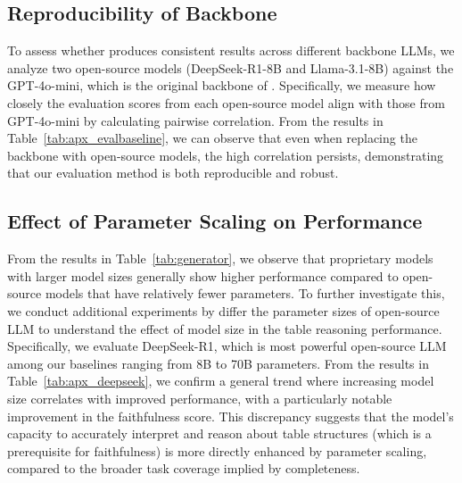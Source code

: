 \subsection{Reproducibility of \eval Backbone}
To assess whether \eval produces consistent results across different backbone LLMs, we analyze two open-source models (DeepSeek-R1-8B and Llama-3.1-8B) against the GPT-4o-mini, which is the original backbone of \eval. Specifically, we measure how closely the evaluation scores from each open-source model align with those from GPT-4o-mini by calculating pairwise correlation.
From the results in Table~\ref{tab:apx_evalbaseline}, we can observe that even when replacing the backbone with open-source models, the high correlation persists, demonstrating that our evaluation method is both reproducible and robust.



\subsection{Effect of Parameter Scaling on \bench Performance}
From the results in Table~\ref{tab:generator}, we observe that proprietary models with larger model sizes generally show higher performance compared to open-source models that have relatively fewer parameters. 
To further investigate this, we conduct additional experiments by differ the parameter sizes of open-source LLM to understand the effect of model size in the table reasoning performance.
Specifically, we evaluate DeepSeek-R1, which is most powerful open-source LLM among our baselines ranging from 8B to 70B parameters.
From the results in Table~\ref{tab:apx_deepseek}, we confirm a general trend where increasing model size correlates with improved performance, with a particularly notable improvement in the faithfulness score.
This discrepancy suggests that the model’s capacity to accurately interpret and reason about table structures (which is a prerequisite for faithfulness) is more directly enhanced by parameter scaling, compared to the broader task coverage implied by completeness.
